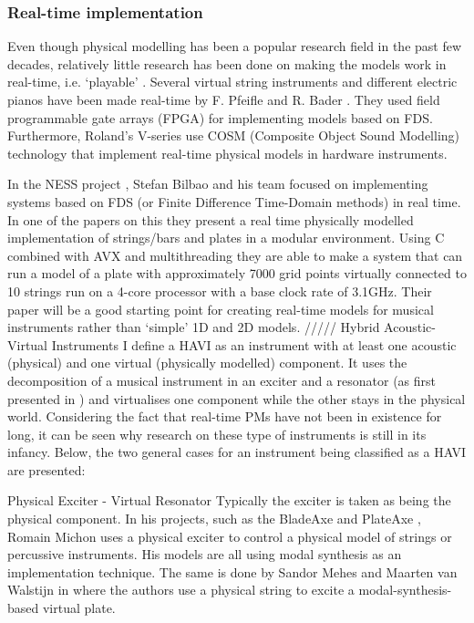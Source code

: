 \subsubsection*{Real-time implementation}
Even though physical modelling has been a popular research field in the past few decades, relatively little research has been done on making the models work in real-time, i.e. `playable’ \cite{Mehes2016}. Several virtual string instruments and different electric pianos have been made real-time by F. Pfeifle and R. Bader \cite{Pfeifle2012, Pfeifle2015, Pfeifle2017}. They used field programmable gate arrays (FPGA) for implementing models based on FDS. Furthermore, Roland’s V-series use COSM (Composite Object Sound Modelling) technology \cite{Bybee2019} that implement real-time physical models in hardware instruments.

In the NESS project \cite{NESS2016}, Stefan Bilbao and his team focused on implementing systems based on FDS (or Finite Difference Time-Domain methods) in real time. In one of the papers on this \cite{Webb2015} they present a real time physically modelled implementation of strings/bars and plates in a modular environment. Using C combined with AVX and multithreading they are able to make a system that can run a model of a plate with approximately 7000 grid points virtually connected to 10 strings run on a 4-core processor with a base clock rate of 3.1GHz. Their paper will be a good starting point for creating real-time models for musical instruments rather than ‘simple’ 1D and 2D models.
/////
Hybrid Acoustic-Virtual Instruments
I define a HAVI as an instrument with at least one acoustic (physical) and one virtual (physically modelled) component. It uses the decomposition of a musical instrument in an exciter and a resonator (as first presented in \cite{Borin1989}) and virtualises one component while the other stays in the physical world. Considering the fact that real-time PMs have not been in existence for long, it can be seen why research on these type of instruments is still in its infancy. Below, the two general cases for an instrument being classified as a HAVI are presented:

Physical Exciter - Virtual Resonator
Typically the exciter is taken as being the physical component. In his projects, such as the BladeAxe and PlateAxe \cite{Michon2016}, Romain Michon uses a physical exciter to control a physical model of strings or percussive instruments. His models are all using modal synthesis as an implementation technique. The same is done by Sandor Mehes and Maarten van Walstijn in \cite{Mehes2016, Mehes2017, Walstijn2017} where the authors use a physical string to excite a modal-synthesis-based virtual plate.

